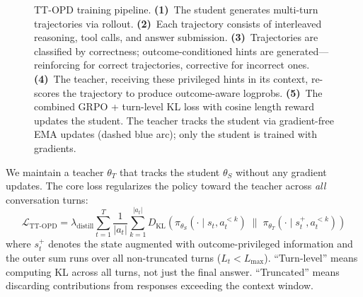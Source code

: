 \documentclass{article}
\begin{document}
\begin{figure}[t]
{%
}%
\caption{TT-OPD training pipeline. \textbf{(1)}~The student generates multi-turn trajectories via rollout. \textbf{(2)}~Each trajectory consists of interleaved reasoning, tool calls, and answer submission. \textbf{(3)}~Trajectories are classified by correctness; outcome-conditioned hints are generated---reinforcing for correct trajectories, corrective for incorrect ones. \textbf{(4)}~The teacher, receiving these privileged hints in its context, re-scores the trajectory to produce outcome-aware logprobs. \textbf{(5)}~The combined GRPO + turn-level KL loss with cosine length reward updates the student. The teacher tracks the student via gradient-free EMA updates (dashed blue arc); only the student is trained with gradients.}
\label{fig:ttopd}
\end{figure}

We maintain a teacher $\theta_T$ that tracks the student $\theta_S$ without any gradient updates. The core loss regularizes the policy toward the teacher across \emph{all} conversation turns:
\begin{equation}
    \mathcal{L}_{\text{TT-OPD}} = \lambda_{\text{distill}} \sum_{t=1}^{T} \frac{1}{|a_t|} \sum_{k=1}^{|a_t|} D_{\text{KL}}\!\left(\pi_{\theta_S}(\cdot \mid s_t, a_t^{<k}) \;\|\; \pi_{\theta_T}(\cdot \mid s_t^{+}, a_t^{<k})\right)
\end{equation}
where $s_t^{+}$ denotes the state augmented with outcome-privileged information and the outer sum runs over all non-truncated turns ($L_t < L_{\max}$). ``Turn-level'' means computing KL across all turns, not just the final answer. ``Truncated'' means discarding contributions from responses exceeding the context window.
\end{document}
